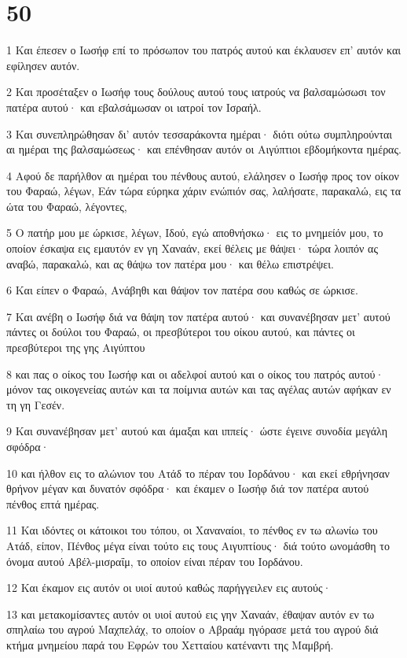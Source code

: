 \chapter{50}

\par 1 Και έπεσεν ο Ιωσήφ επί το πρόσωπον του πατρός αυτού και έκλαυσεν επ' αυτόν και εφίλησεν αυτόν.
\par 2 Και προσέταξεν ο Ιωσήφ τους δούλους αυτού τους ιατρούς να βαλσαμώσωσι τον πατέρα αυτού· και εβαλσάμωσαν οι ιατροί τον Ισραήλ.
\par 3 Και συνεπληρώθησαν δι' αυτόν τεσσαράκοντα ημέραι· διότι ούτω συμπληρούνται αι ημέραι της βαλσαμώσεως· και επένθησαν αυτόν οι Αιγύπτιοι εβδομήκοντα ημέρας.
\par 4 Αφού δε παρήλθον αι ημέραι του πένθους αυτού, ελάλησεν ο Ιωσήφ προς τον οίκον του Φαραώ, λέγων, Εάν τώρα εύρηκα χάριν ενώπιόν σας, λαλήσατε, παρακαλώ, εις τα ώτα του Φαραώ, λέγοντες,
\par 5 Ο πατήρ μου με ώρκισε, λέγων, Ιδού, εγώ αποθνήσκω· εις το μνημείόν μου, το οποίον έσκαψα εις εμαυτόν εν γη Χαναάν, εκεί θέλεις με θάψει· τώρα λοιπόν ας αναβώ, παρακαλώ, και ας θάψω τον πατέρα μου· και θέλω επιστρέψει.
\par 6 Και είπεν ο Φαραώ, Ανάβηθι και θάψον τον πατέρα σου καθώς σε ώρκισε.
\par 7 Και ανέβη ο Ιωσήφ διά να θάψη τον πατέρα αυτού· και συνανέβησαν μετ' αυτού πάντες οι δούλοι του Φαραώ, οι πρεσβύτεροι του οίκου αυτού, και πάντες οι πρεσβύτεροι της γης Αιγύπτου
\par 8 και πας ο οίκος του Ιωσήφ και οι αδελφοί αυτού και ο οίκος του πατρός αυτού· μόνον τας οικογενείας αυτών και τα ποίμνια αυτών και τας αγέλας αυτών αφήκαν εν τη γη Γεσέν.
\par 9 Και συνανέβησαν μετ' αυτού και άμαξαι και ιππείς· ώστε έγεινε συνοδία μεγάλη σφόδρα·
\par 10 και ήλθον εις το αλώνιον του Ατάδ το πέραν του Ιορδάνου· και εκεί εθρήνησαν θρήνον μέγαν και δυνατόν σφόδρα· και έκαμεν ο Ιωσήφ διά τον πατέρα αυτού πένθος επτά ημέρας.
\par 11 Και ιδόντες οι κάτοικοι του τόπου, οι Χαναναίοι, το πένθος εν τω αλωνίω του Ατάδ, είπον, Πένθος μέγα είναι τούτο εις τους Αιγυπτίους· διά τούτο ωνομάσθη το όνομα αυτού Αβέλ-μισραΐμ, το οποίον είναι πέραν του Ιορδάνου.
\par 12 Και έκαμον εις αυτόν οι υιοί αυτού καθώς παρήγγειλεν εις αυτούς·
\par 13 και μετακομίσαντες αυτόν οι υιοί αυτού εις γην Χαναάν, έθαψαν αυτόν εν τω σπηλαίω του αγρού Μαχπελάχ, το οποίον ο Αβραάμ ηγόρασε μετά του αγρού διά κτήμα μνημείου παρά του Εφρών του Χετταίου κατέναντι της Μαμβρή.
